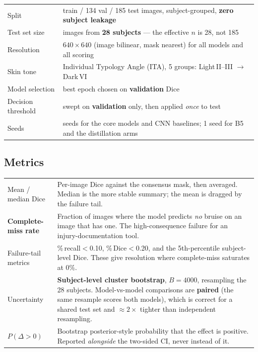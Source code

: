 \documentclass[11pt]{article}
\begin{document}
\begin{center}\small
\begin{tabular}{>{\raggedright\arraybackslash}p{3.4cm} >{\raggedright\arraybackslash}p{11cm}}
\toprule
Split & 697 train / 134 val / 185 test images, subject-grouped, \textbf{zero subject leakage} \\
Test set size & 185 images from \textbf{28 subjects} --- the effective $n$ is 28, not 185 \\
Resolution & $640\times640$ (image bilinear, mask nearest) for all models and all scoring \\
Skin tone & Individual Typology Angle (ITA), 5 groups: Light\,II--III $\to$ Dark\,VI \\
Model selection & best epoch chosen on \textbf{validation} Dice \\
Decision threshold & swept on \textbf{validation} only, then applied \emph{once} to test \\
Seeds & 3 seeds for the core models and CNN baselines; 1 seed for B5 and the distillation arms \\
\bottomrule
\end{tabular}
\end{center}

\subsection{Metrics}

\begin{center}\small
\begin{tabular}{>{\raggedright\arraybackslash}p{4.0cm} >{\raggedright\arraybackslash}p{10.4cm}}
\toprule
Mean / median Dice & Per-image Dice against the consensus mask, then averaged. Median is the more
stable summary; the mean is dragged by the failure tail. \\
\textbf{Complete-miss rate} & Fraction of images where the model predicts \emph{no} bruise on an
image that has one. The high-consequence failure for an injury-documentation tool. \\
Failure-tail metrics & \%\,recall$<$0.10, \%\,Dice$<$0.20, and the 5th-percentile subject-level
Dice. These give resolution where complete-miss saturates at $0\%$. \\
Uncertainty & \textbf{Subject-level cluster bootstrap}, $B=4000$, resampling the 28 subjects.
Model-vs-model comparisons are \textbf{paired} (the same resample scores both models), which is
correct for a shared test set and $\approx2\times$ tighter than independent resampling. \\
$P(\Delta>0)$ & Bootstrap posterior-style probability that the effect is positive. Reported
\emph{alongside} the two-sided CI, never instead of it. \\
\bottomrule
\end{tabular}
\end{center}
\end{document}
